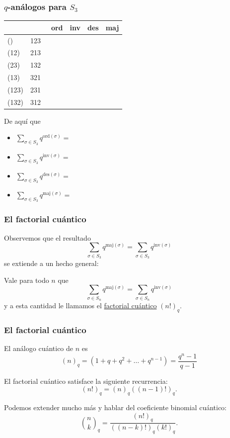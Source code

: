 \documentclass[grey]{beamer}
\newcommand{\sg}{\sigma}
\newcommand{\ord}{\text{ord}}
\newcommand{\inv}{\text{inv}}
\newcommand{\des}{\text{des}}
\newcommand{\maj}{\text{maj}}
\begin{document}
\begin{frame}[t]\frametitle{$q$-análogos para $S_3$}
  \begin{table}[]
    \begin{tabular}{llllll}\toprule
          &     & ord & inv & des & maj \\
          \midrule
    ()    & 123\ &     &     &     &     \\
    (12)  & 213\ &     &     &     &     \\
    (23)  & 132\ &     &     &     &     \\
    (13)  & 321\ &     &     &     &     \\
    (123) & 231\ &     &     &     &     \\
    (132) & 312\ &     &     &     &     \\
    \bottomrule
    \end{tabular}
    \end{table}\pause
  De aquí que 
  \begin{itemize}
    \itemsep=0.5em
    \item $\sum_{\sg\in S_3}q^{\ord(\sg)}=$
    \item $\sum_{\sg\in S_3}q^{\inv(\sg)}=$
    \item $\sum_{\sg\in S_3}q^{\des(\sg)}=$
    \item $\sum_{\sg\in S_3}q^{\maj(\sg)}=$
  \end{itemize}
\end{frame}

\begin{frame}[t]\frametitle{El factorial cuántico}
  Observemos que el resultado
  $$\sum_{\sg\in S_3}q^{\maj(\sg)}=\sum_{\sg\in S_3}q^{\inv(\sg)}$$
  se extiende a un hecho general:\pause
  \begin{theorem}
    Vale para todo $n$ que 
  $$\sum_{\sg\in S_n}q^{\maj(\sg)}=\sum_{\sg\in S_n}q^{\inv(\sg)}$$
y a esta cantidad le llamamos el \underline{factorial cuántico} $(n!)_q$.
  \end{theorem}
\end{frame}

\begin{frame}[t]\frametitle{El factorial cuántico}
  \begin{definition}
    El análogo cuántico de $n$ es 
    $$(n)_q=(1+q+q^2+\dots+q^{n-1})=\frac{q^n-1}{q-1}$$
  \end{definition}\pause
\begin{theorem}
  El factorial cuántico satisface la siguiente recurrencia:
  $$(n!)_q=(n)_q((n-1)!)_q.$$
\end{theorem}\pause 
Podemos extender mucho más y hablar del coeficiente binomial cuántico:
$$\binom{n}{k}_q=\frac{(n!)_q}{((n-k)!)_q(k!)_q}.$$
\end{frame}
\end{document}
